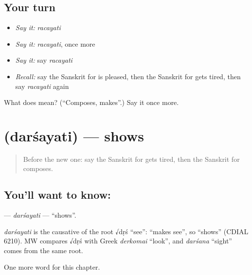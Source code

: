 \subsection*{Your turn}
\begin{itemize}
\raggedright
  \item \emph{Say it:} \emph{racayati}
  \item \emph{Say it:} \emph{racayati}, once more
  \item \emph{Say it:} say \emph{racayati}
  \item \emph{Recall:} say the Sanskrit for is pleased, then the Sanskrit for gets tired, then say \emph{racayati} again
\end{itemize}

\begin{tcolorbox}[breakable,colback=teal!4,colframe=teal!35!black,title={Before you move on}]
What does  mean? (\textquotedblleft{}Composes, makes\textquotedblright{}.) Say it once more.
\end{tcolorbox}
\section[\texorpdfstring{\sk{दर्शयति} (darśayati)}{दर्शयति (darśayati)}]{ (darśayati) — shows}

\label{lesson:SA-C142-darsayati}



\begin{quote}
Before the new one: say the Sanskrit for gets tired, then the Sanskrit for composes.
\end{quote}

\subsection*{You'll want to know: }
\textbf{} — \emph{darśayati} — \textquotedblleft{}shows\textquotedblright{}.

\begin{cousinweb}
\emph{darśayati} is the causative of the root √dṛś \textquotedblleft{}see\textquotedblright{}: \textquotedblleft{}makes see\textquotedblright{}, so \textquotedblleft{}shows\textquotedblright{} (CDIAL 6210). MW compares √dṛś with Greek \emph{derkomai} \textquotedblleft{}look\textquotedblright{}, and \emph{darśana} \textquotedblleft{}sight\textquotedblright{} comes from the same root.
\end{cousinweb}

\begin{grammarlens}[title={What you've built}]
One more word for this chapter.
\end{grammarlens}


